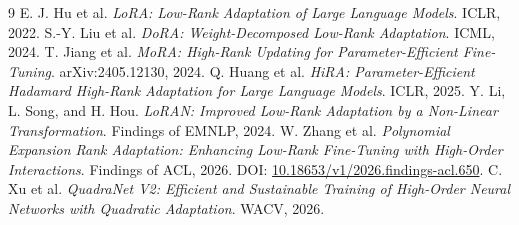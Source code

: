 \documentclass[11pt]{article}
\begin{document}
\begin{thebibliography}{9}
 E. J. Hu et al. \emph{LoRA: Low-Rank Adaptation of Large Language Models}. ICLR, 2022.
 S.-Y. Liu et al. \emph{DoRA: Weight-Decomposed Low-Rank Adaptation}. ICML, 2024.
 T. Jiang et al. \emph{MoRA: High-Rank Updating for Parameter-Efficient Fine-Tuning}. arXiv:2405.12130, 2024.
 Q. Huang et al. \emph{HiRA: Parameter-Efficient Hadamard High-Rank Adaptation for Large Language Models}. ICLR, 2025.
 Y. Li, L. Song, and H. Hou. \emph{LoRAN: Improved Low-Rank Adaptation by a Non-Linear Transformation}. Findings of EMNLP, 2024.
 W. Zhang et al. \emph{Polynomial Expansion Rank Adaptation: Enhancing Low-Rank Fine-Tuning with High-Order Interactions}. Findings of ACL, 2026. DOI: \href{https://doi.org/10.18653/v1/2026.findings-acl.650}{10.18653/v1/2026.findings-acl.650}.
 C. Xu et al. \emph{QuadraNet V2: Efficient and Sustainable Training of High-Order Neural Networks with Quadratic Adaptation}. WACV, 2026.
\end{thebibliography}
\end{document}
